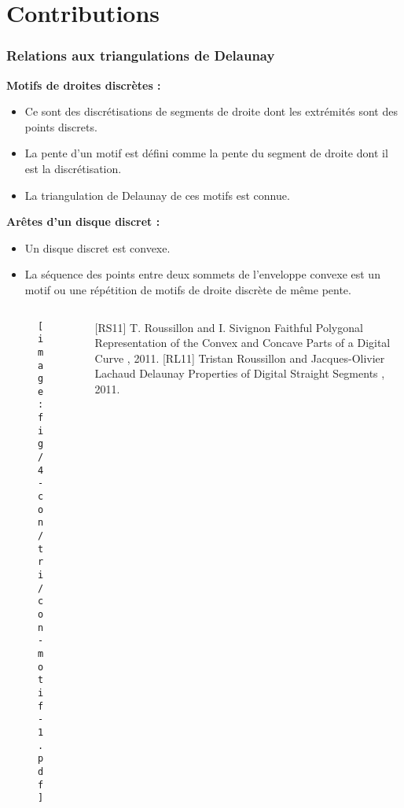 \section{Contributions}

\begin{frame}
\frametitle{Relations aux triangulations de Delaunay}


{
  \begin{block}{}
	\textbf{Motifs de droites discrètes :}\\
	\begin{itemize}
    \item Ce sont des discrétisations de segments de droite dont les extrémités sont des points discrets.
    \item La pente d'un motif est défini comme la pente du segment de droite dont il est la discrétisation.
    \item La triangulation de Delaunay de ces motifs est connue.
  \end{itemize}
	
	
	\textbf{Arêtes d'un disque discret :}\\
	\begin{itemize}
    \item Un disque discret est convexe.
    \item La séquence des points entre deux sommets de l'enveloppe convexe est un motif ou une répétition de motifs de droite discrète de même pente.
  \end{itemize}

  \end{block}

  \begin{columns}[t]
    \begin{column}{0.5\linewidth}
    	\begin{figure}[H]
	      \centering
	      \texttt{[image: fig/4-con/tri/con-motif-1.pdf]}
	    \end{figure}

    \end{column}
    \begin{column}{0.5\linewidth}
      \begin{thebibliography}{alpha}
      \scriptsize
        [RS11] T. Roussillon and I. Sivignon
        \newblock Faithful Polygonal Representation of the Convex and Concave Parts of a Digital Curve
        , 2011.    
        [RL11] Tristan Roussillon and Jacques-Olivier Lachaud
        \newblock Delaunay Properties of Digital Straight Segments
        , 2011.
      \end{thebibliography}
      \scriptsize     
    \end{column}
  \end{columns}   
}


\end{frame}

